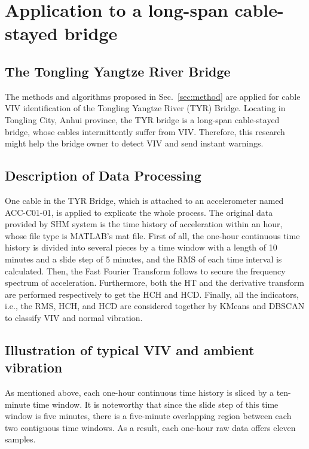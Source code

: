 \documentclass[preprint, 3p, times, compress, 11pt]{elsarticle}
\begin{document}
\section{Application to a long-span cable-stayed bridge}
\label{sec:experiment}

\subsection{The Tongling Yangtze River Bridge}

The methods and algorithms proposed in Sec.~\ref{sec:method} are 
applied for cable VIV identification of the Tongling Yangtze River 
(TYR) Bridge. Locating in Tongling City, Anhui province, the TYR bridge 
is a long-span cable-stayed bridge, whose cables intermittently suffer 
from VIV. Therefore, this research might help the bridge owner to 
detect VIV and send instant warnings.

\subsection{Description of Data Processing}

One cable in the TYR Bridge, which is attached to an accelerometer 
named ACC-C01-01, is applied to explicate the whole process. The original 
data provided by SHM system is the time history of acceleration within an 
hour, whose file type is MATLAB's mat file. First of all, the one-hour 
continuous time history is divided into several pieces by a time window 
with a length of 10 minutes and a slide step of 5 minutes, and the RMS 
of each time interval is calculated. Then, the Fast Fourier Transform 
follows to secure the frequency spectrum of acceleration. Furthermore, 
both the HT and the derivative transform are performed respectively to 
get the HCH and HCD. Finally, all the indicators, i.e., the RMS, HCH, 
and HCD are considered together by KMeans and DBSCAN to classify VIV and 
normal vibration. 

\subsection{Illustration of typical VIV and ambient vibration} 

As mentioned above, each one-hour continuous time history is sliced by 
a ten-minute time window. It is noteworthy that since the slide step of 
this time window is five minutes, there is a five-minute overlapping 
region between each two contiguous time windows. As a result, each 
one-hour raw data offers eleven samples.
\end{document}
